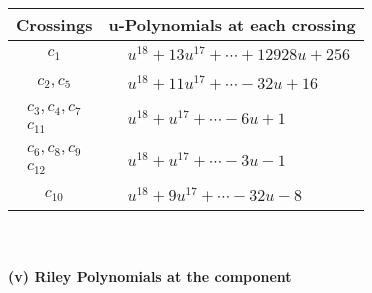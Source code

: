 \documentclass[1p]{elsarticle_modified}
\theoremstyle{definition}
\begin{document}
\begin{tabular}{m{50pt}|m{274pt}}
Crossings & \hspace{64pt}u-Polynomials at each crossing \\
\hline $$\begin{aligned}c_{1}\end{aligned}$$&$\begin{aligned}
&u^{18}+13 u^{17}+\cdots+12928 u+256
\end{aligned}$\\
\hline $$\begin{aligned}c_{2},c_{5}\end{aligned}$$&$\begin{aligned}
&u^{18}+11 u^{17}+\cdots-32 u+16
\end{aligned}$\\
\hline $$\begin{aligned}c_{3},c_{4},c_{7}\\c_{11}\end{aligned}$$&$\begin{aligned}
&u^{18}+u^{17}+\cdots-6 u+1
\end{aligned}$\\
\hline $$\begin{aligned}c_{6},c_{8},c_{9}\\c_{12}\end{aligned}$$&$\begin{aligned}
&u^{18}+u^{17}+\cdots-3 u-1
\end{aligned}$\\
\hline $$\begin{aligned}c_{10}\end{aligned}$$&$\begin{aligned}
&u^{18}+9 u^{17}+\cdots-32 u-8
\end{aligned}$\\
\hline
\end{tabular}\\~\\
\newpage\renewcommand{\arraystretch}{1}
\flushleft \textbf{(v) Riley Polynomials at the component}\newline \\
\end{document}
